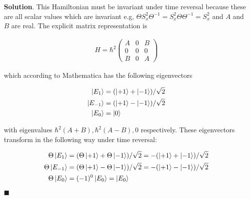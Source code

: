 \documentclass[12pt]{article}
\theoremstyle{definition}
\newenvironment{s}{%
        \begin{trivlist} \item \textbf{Solution}. }{%
            \hspace*{\fill} $\blacksquare$\end{trivlist}}%
\begin{document}
{\begin{s}
This Hamiltonian must be invariant under time reversal because these are all scalar values which are invariant e.g, $\Theta S_{x}^{2}\Theta^{-1} = S_{x}^{2}\Theta\Theta^{-1} = S_{x}^{2}$ and $A$ and $B$ are real. The explicit matrix representation is

\begin{align*}
H = \hbar^{2}\begin{pmatrix}A&0&B\\0&0&0\\B&0&A\end{pmatrix}
\end{align*}

which according to Mathematica has the following eigenvectors


\begin{align*}
\ket{E_{1}} &= (\ket{+1}+\ket{-1})/\sqrt{2}\\
\ket{E_{-1}} &= (\ket{+1}-\ket{-1})/\sqrt{2}\\
\ket{E_{0}} &= \ket{0}\\
\end{align*}

with eigenvalues $\hbar^{2}(A+B), \hbar^{2}(A-B), 0$ respectively. These eigenvectors transform in the following way under time reversal:

\begin{align*}
\Theta\ket{E_{1}} &= (\Theta\ket{+1}+\Theta\ket{-1})/\sqrt{2} = -(\ket{+1}+\ket{-1})/\sqrt{2}\\
\Theta\ket{E_{-1}} &= (\Theta\ket{+1}-\Theta\ket{-1})/\sqrt{2} = -(\ket{+1}-\ket{-1})/\sqrt{2}\\
\Theta\ket{E_{0}} &= (-1)^{0}\ket{E_{0}} = \ket{E_{0}}\\
\end{align*}


\end{s}
\end{document}
